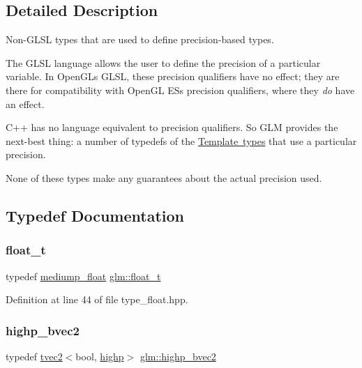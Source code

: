 \subsection{Detailed Description}
Non-\/\+G\+L\+SL types that are used to define precision-\/based types. 

The G\+L\+SL language allows the user to define the precision of a particular variable. In Open\+GL\textquotesingle{}s G\+L\+SL, these precision qualifiers have no effect; they are there for compatibility with Open\+GL ES\textquotesingle{}s precision qualifiers, where they {\itshape do} have an effect.

C++ has no language equivalent to precision qualifiers. So G\+LM provides the next-\/best thing\+: a number of typedefs of the \mbox{\hyperlink{group__core__template}{Template types}} that use a particular precision.

None of these types make any guarantees about the actual precision used. 

\subsection{Typedef Documentation}
\mbox{\label{group__core__precision_gae01b87f81bd15327230bf1b47c482b24}} 
\subsubsection{\texorpdfstring{float\_t}{float\_t}}
{\footnotesize\ttfamily typedef \mbox{\hyperlink{group__core__precision_gac785826c039fe6c97c03b37c81c1a68e}{mediump\+\_\+float}} \mbox{\hyperlink{group__core__precision_gae01b87f81bd15327230bf1b47c482b24}{glm\+::float\+\_\+t}}}



Definition at line 44 of file type\+\_\+float.\+hpp.

\mbox{\label{group__core__precision_gaf76ced5823e8aace6bd257fac6c250cb}} 
\subsubsection{\texorpdfstring{highp\_bvec2}{highp\_bvec2}}
{\footnotesize\ttfamily typedef \mbox{\hyperlink{structglm_1_1tvec2}{tvec2}}$<$bool, \mbox{\hyperlink{namespaceglm_a0f04f086094c747d227af4425893f545ac6f7eab42eacbb10d59a58e95e362074}{highp}}$>$ \mbox{\hyperlink{group__core__precision_gaf76ced5823e8aace6bd257fac6c250cb}{glm\+::highp\+\_\+bvec2}}}

